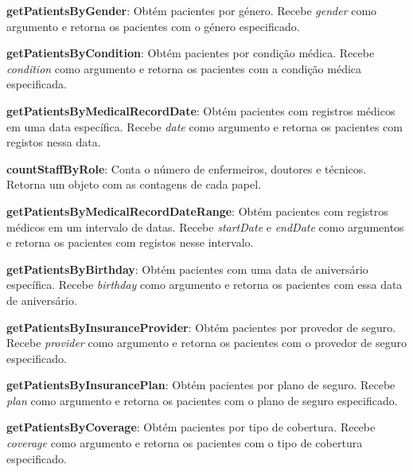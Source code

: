 \vspace{0.15cm}

\textbf{getPatientsByGender}: Obtém pacientes por género. Recebe \textit{gender} como argumento e retorna os pacientes com o género especificado.

\vspace{0.15cm}

\textbf{getPatientsByCondition}: Obtém pacientes por condição médica. Recebe \textit{condition} como argumento e retorna os pacientes com a condição médica especificada.

\vspace{0.15cm}

\textbf{getPatientsByMedicalRecordDate}: Obtém pacientes com registros médicos em uma data específica. Recebe \textit{date} como argumento e retorna os pacientes com registos nessa data.

\vspace{0.15cm}

\textbf{countStaffByRole}: Conta o número de enfermeiros, doutores e técnicos. Retorna um objeto com as contagens de cada papel.

\vspace{0.15cm}

\textbf{getPatientsByMedicalRecordDateRange}: Obtém pacientes com registros médicos em um intervalo de datas. Recebe \textit{startDate} e \textit{endDate} como argumentos e retorna os pacientes com registos nesse intervalo.

\vspace{0.15cm}

\textbf{getPatientsByBirthday}: Obtém pacientes com uma data de aniversário específica. Recebe \textit{birthday} como argumento e retorna os pacientes com essa data de aniversário.

\vspace{0.15cm}

\textbf{getPatientsByInsuranceProvider}: Obtém pacientes por provedor de seguro. Recebe \textit{provider} como argumento e retorna os pacientes com o provedor de seguro especificado.

\vspace{0.15cm}

\textbf{getPatientsByInsurancePlan}: Obtém pacientes por plano de seguro. Recebe \textit{plan} como argumento e retorna os pacientes com o plano de seguro especificado.

\vspace{0.15cm}

\textbf{getPatientsByCoverage}: Obtém pacientes por tipo de cobertura. Recebe \textit{coverage} como argumento e retorna os pacientes com o tipo de cobertura especificado.


